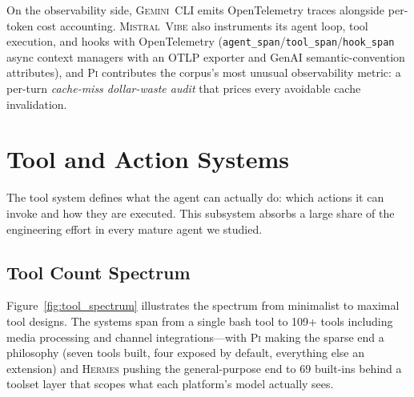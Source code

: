 \documentclass[11pt,a4paper]{article}
\newcommand{\vibe}{\textsc{Mistral~Vibe}\xspace}
\newcommand{\gemini}{\textsc{Gemini~CLI}\xspace}
\newcommand{\hrm}{\textsc{Hermes}\xspace}
\newcommand{\pib}{\textsc{Pi}\xspace}
\begin{document}
On the observability side, \gemini{} emits OpenTelemetry traces alongside per-token cost accounting.
\vibe{} also instruments its agent loop, tool execution, and hooks with OpenTelemetry (\texttt{agent\_span}/\texttt{tool\_span}/\texttt{hook\_span} async context managers with an OTLP exporter and GenAI semantic-convention attributes), and \pib{} contributes the corpus's most unusual observability metric: a per-turn \emph{cache-miss dollar-waste audit} that prices every avoidable cache invalidation.

\section{Tool and Action Systems}
\label{sec:tools}

The tool system defines what the agent can actually do: which actions it can invoke and how they are executed.
This subsystem absorbs a large share of the engineering effort in every mature agent we studied.

\subsection{Tool Count Spectrum}

Figure~\ref{fig:tool_spectrum} illustrates the spectrum from minimalist to maximal tool designs.
The systems span from a single bash tool to 109+ tools including media processing and channel integrations---with \pib{} making the sparse end a philosophy (seven tools built, four exposed by default, everything else an extension) and \hrm{} pushing the general-purpose end to 69 built-ins behind a toolset layer that scopes what each platform's model actually sees.
\end{document}
